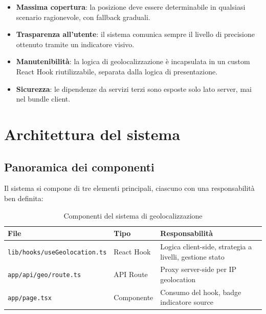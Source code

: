 \documentclass[12pt, a4paper]{article}
\begin{document}
\begin{itemize}[leftmargin=1.5em]
  \item \textbf{Massima copertura}: la posizione deve essere determinabile
    in qualsiasi scenario ragionevole, con fallback graduali.
  \item \textbf{Trasparenza all'utente}: il sistema comunica sempre il livello
    di precisione ottenuto tramite un indicatore visivo.
  \item \textbf{Manutenibilità}: la logica di geolocalizzazione è incapsulata
    in un custom React Hook riutilizzabile, separata dalla logica di
    presentazione.
  \item \textbf{Sicurezza}: le dipendenze da servizi terzi sono esposte solo
    lato server, mai nel bundle client.
\end{itemize}

\section{Architettura del sistema}

\subsection{Panoramica dei componenti}

Il sistema si compone di tre elementi principali, ciascuno con una
responsabilità ben definita:

\begin{table}[h!]
  \centering
  \caption{Componenti del sistema di geolocalizzazione}
  \begin{tabularx}{\linewidth}{L{4.5cm} C{2.5cm} L{6.5cm}}
    \toprule
    \textbf{File} & \textbf{Tipo} & \textbf{Responsabilità} \\
    \midrule
    \texttt{lib/hooks/useGeolocation.ts} & React Hook & Logica client-side, strategia a livelli, gestione stato \\
    \addlinespace
    \texttt{app/api/geo/route.ts} & API Route & Proxy server-side per IP geolocation \\
    \addlinespace
    \texttt{app/page.tsx} & Componente & Consumo del hook, badge indicatore source \\
    \bottomrule
  \end{tabularx}
\end{table}
\end{document}
